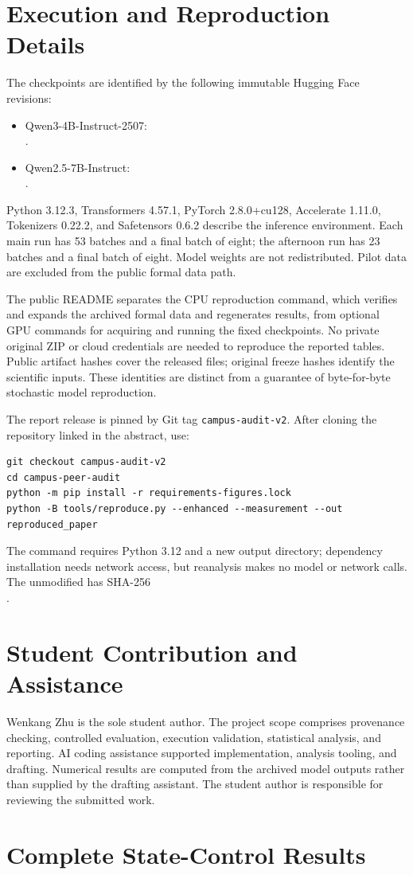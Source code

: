 \documentclass[conference]{IEEEtran}
\newcommand{\code}[1]{\texttt{#1}}
\begin{document}
\section{Execution and Reproduction Details}
The checkpoints are identified by the following immutable Hugging Face revisions:
\begin{itemize}
\item Qwen3-4B-Instruct-2507:\\{\footnotesize{}}.
\item Qwen2.5-7B-Instruct:\\{\footnotesize{}}.
\end{itemize}
Python 3.12.3, Transformers 4.57.1, PyTorch 2.8.0+cu128, Accelerate 1.11.0, Tokenizers 0.22.2, and Safetensors 0.6.2 describe the inference environment. Each main run has 53 batches and a final batch of eight; the afternoon run has 23 batches and a final batch of eight. Model weights are not redistributed. Pilot data are excluded from the public formal data path.

The public README separates the CPU reproduction command, which verifies and expands the archived formal data and regenerates results, from optional GPU commands for acquiring and running the fixed checkpoints. No private original ZIP or cloud credentials are needed to reproduce the reported tables. Public artifact hashes cover the released files; original freeze hashes identify the scientific inputs. These identities are distinct from a guarantee of byte-for-byte stochastic model reproduction.

The report release is pinned by Git tag \code{campus-audit-v2}. After cloning the repository linked in the abstract, use:
\begin{verbatim}
git checkout campus-audit-v2
cd campus-peer-audit
python -m pip install -r requirements-figures.lock
python -B tools/reproduce.py --enhanced --measurement --out reproduced_paper
\end{verbatim}
The command requires Python 3.12 and a new output directory; dependency installation needs network access, but reanalysis makes no model or network calls. The unmodified  has SHA-256\\
{\footnotesize{}}.

\section{Student Contribution and Assistance}
Wenkang Zhu is the sole student author. The project scope comprises provenance checking, controlled evaluation, execution validation, statistical analysis, and reporting. AI coding assistance supported implementation, analysis tooling, and drafting. Numerical results are computed from the archived model outputs rather than supplied by the drafting assistant. The student author is responsible for reviewing the submitted work.
\clearpage
\section{Complete State-Control Results}

\end{document}
